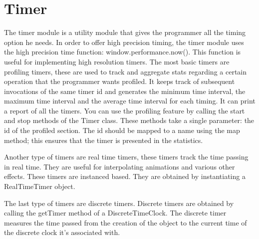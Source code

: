 \section{Timer}

The timer module is a utility module that gives the programmer all the timing option he needs. In order to offer high precision timing, the timer module uses the high precision time function: window.performance.now(). This function is useful for implementing high resolution timers.
The most basic timers are profiling timers, these are used to track and aggregate stats regarding a certain operation that the programmer wants profiled. It keeps track of subsequent invocations of the same timer id and generates the minimum time interval, the maximum time interval and the average time interval for each timing. It can print a report of all the timers. You can use the profiling feature by calling the start and stop methods of the Timer class. These methods take a single parameter: the id of the profiled section. The id should be mapped to a name using the map method; this ensures that the timer is presented in the statistics.

Another type of timers are real time timers, these timers track the time passing in real time. They are useful for interpolating animations and various other effects. These timers are instanced based. They are obtained by instantiating a RealTimeTimer object.

The last type of timers are discrete timers. Discrete timers are obtained by calling the getTimer method of a DiscreteTimeClock. The discrete timer measures the time passed from the creation of the object to the current time of the discrete clock it’s associated with.

